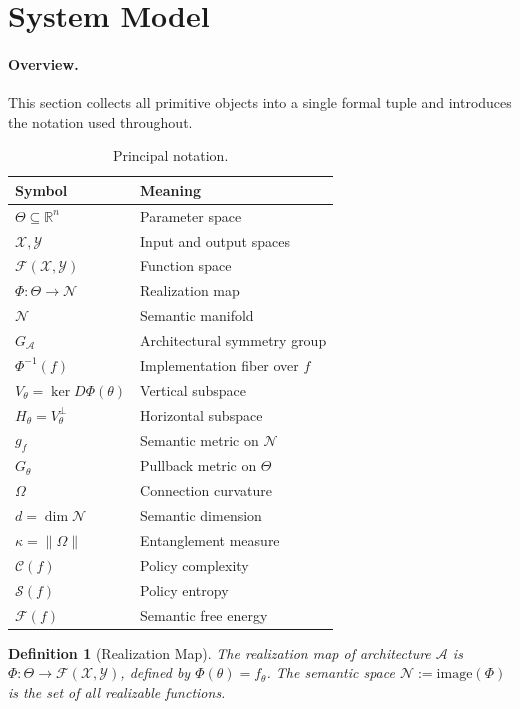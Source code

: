 \documentclass[twocolumn,10pt]{article}
\theoremstyle{thmstyle}
\theoremstyle{defstyle}
\newtheorem{definition}[theorem]{Definition}
\begin{document}
\section{System Model}
\label{sec:model}

\paragraph{Overview.}
This section collects all primitive objects into a single formal tuple
and introduces the notation used throughout.

\begin{table}[t]
\centering
\caption{Principal notation.}
\label{tab:notation}
\small
\begin{tabular}{@{}ll@{}}
\toprule
Symbol & Meaning \\
\midrule
$\Theta \subseteq \mathbb{R}^n$ & Parameter space \\
$\mathcal{X}, \mathcal{Y}$ & Input and output spaces \\
$\mathcal{F}(\mathcal{X},\mathcal{Y})$ & Function space \\
$\Phi : \Theta \to \mathcal{N}$ & Realization map \\
$\mathcal{N}$ & Semantic manifold \\
$G_\mathcal{A}$ & Architectural symmetry group \\
$\Phi^{-1}(f)$ & Implementation fiber over $f$ \\
$V_\theta = \ker D\Phi(\theta)$ & Vertical subspace \\
$H_\theta = V_\theta^\perp$ & Horizontal subspace \\
$g_f$ & Semantic metric on $\mathcal{N}$ \\
$G_\theta$ & Pullback metric on $\Theta$ \\
$\Omega$ & Connection curvature \\
$d = \dim\mathcal{N}$ & Semantic dimension \\
$\kappa = \|\Omega\|$ & Entanglement measure \\
$\mathcal{C}(f)$ & Policy complexity \\
$\mathcal{S}(f)$ & Policy entropy \\
$\mathcal{F}(f)$ & Semantic free energy \\
\bottomrule
\end{tabular}
\end{table}

\begin{definition}[Realization Map]
The \emph{realization map} of architecture $\mathcal{A}$ is
$\Phi : \Theta \to \mathcal{F}(\mathcal{X},\mathcal{Y})$, defined by
$\Phi(\theta) = f_\theta$. The \emph{semantic space}
$\mathcal{N} := \mathrm{image}(\Phi)$ is the set of all realizable
functions.
\end{definition}
\end{document}
